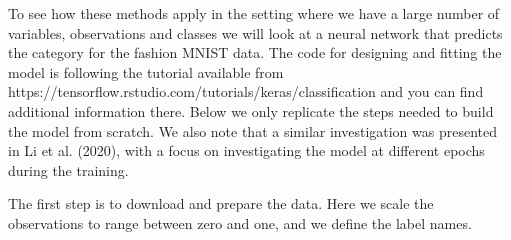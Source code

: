 \documentclass[
  letterpaper,
]{krantz}
\newenvironment{Shaded}{\begin{snugshade}}{\end{snugshade}}
\newcommand{\CommentTok}[1]{\textcolor[rgb]{0.37,0.37,0.37}{#1}}
\newcommand{\DecValTok}[1]{\textcolor[rgb]{0.68,0.00,0.00}{#1}}
\newcommand{\FunctionTok}[1]{\textcolor[rgb]{0.28,0.35,0.67}{#1}}
\newcommand{\NormalTok}[1]{\textcolor[rgb]{0.00,0.23,0.31}{#1}}
\newcommand{\OtherTok}[1]{\textcolor[rgb]{0.00,0.23,0.31}{#1}}
\newcommand{\SpecialCharTok}[1]{\textcolor[rgb]{0.37,0.37,0.37}{#1}}
\newcommand{\StringTok}[1]{\textcolor[rgb]{0.13,0.47,0.30}{#1}}
\begin{document}
To see how these methods apply in the setting where we have a large
number of variables, observations and classes we will look at a neural
network that predicts the category for the fashion MNIST data. The code
for designing and fitting the model is following the tutorial available
from https://tensorflow.rstudio.com/tutorials/keras/classification and
you can find additional information there. Below we only replicate the
steps needed to build the model from scratch. We also note that a
similar investigation was presented in Li et al. (2020), with a focus on
investigating the model at different epochs during the training.

The first step is to download and prepare the data. Here we scale the
observations to range between zero and one, and we define the label
names.

\begin{Shaded}
\end{Shaded}
\end{document}
